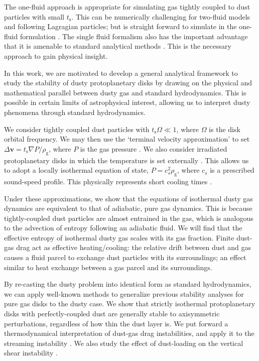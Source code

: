 \documentclass[iop, numberedappendix]{emulateapj}
\newcommand{\rhog}{\rho_\mathrm{g}}
\newcommand{\tstop}{t_\mathrm{s}}
\begin{document}
The one-fluid approach is appropriate for 
simulating gas tightly coupled to dust particles with small $\tstop$.  
This can be numerically challenging for two-fluid models and 
following Lagragian particles; but is straight forward to simulate in the 
one-fluid formulation \citep{price15}.  The single fluid formalism
also has the important advantage that it is 
amenable to standard analytical methods \citep{youdin05a,jacquet11}.  
This is the necessary  approach to gain physical insight. 


In this work, we are motivated to develop a general analytical
framework to study the stability of dusty protoplanetary 
disks by drawing on the physical and mathematical parallel between
dusty gas and standard hydrodynamics. This is possible in certain limits of astrophysical
interest, allowing us to interpret dusty phenomena through standard
hydrodynamics.   

We consider tightly coupled dust particles with $\tstop\Omega\ll
1$, where $\Omega$ is the disk orbital frequency. We may then use the
`terminal velocity approximation' to set $\Delta \bm{v} = \tstop\nabla
P/\rhog$, where $P$ is the gas pressure \citep{youdin05a, 
  jacquet11,laibe14}. %
 We also consider irradiated protoplanetary disks 
in which the temperature is set externally
\citep{chiang97,stam08}. This allows us to adopt a locally isothermal
equation of state, $P = c_s^2\rhog$, where $c_s$ is a prescribed
sound-speed profile. This physically represents short cooling times
\citep{lin15}.   

Under these approximations, we show that the equations of 
isothermal dusty gas dynamics are equivalent to that of adiabatic, pure gas
dynamics. This is because tightly-coupled dust particles are almost
entrained in the gas, which is analogous to the advection
of entropy following an adiabatic fluid. We will find that the   
effective entropy of isothermal dusty gas scales with its gas
fraction. Finite dust-gas drag act as effective heating/cooling: the relative
drift between dust and gas causes a fluid parcel to exchange dust
particles with its surroundings; an effect similar to heat exchange
between a gas parcel and its surroundings.   


By re-casting the dusty problem into identical form as standard  
hydrodynamics, we can apply well-known methods to generalize previous stability 
analyses for pure gas disks to the dusty case. %
We show that strictly isothermal protoplanetary disks with
perfectly-coupled dust are generally
stable to axisymmetric perturbations, regardless of how  thin the dust
layer is. We put forward a thermodynamical interpretation of
dust-gas drag instabilities, and apply it to the
streaming instability \citep[SI, ][]{youdin05a,youdin07b,jacquet11}. 
We also study the effect of dust-loading on the vertical shear
instability \citep[VSI,][]{nelson13,lin15,barker15}. 
\end{document}
